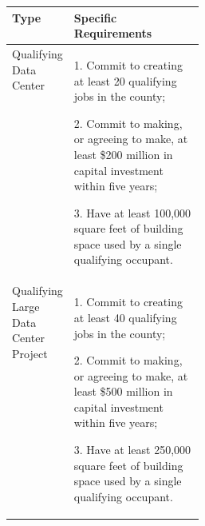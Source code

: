 \begin{longtable}{|L{0.28\linewidth}|L{\arrayrulewidth\relax}|}
\textbf{Type} & \textbf{Specific Requirements} \\ \hline
Qualifying Data Center &
1. Commit to creating at least 20 qualifying jobs in the county;\par
2. Commit to making, or agreeing to make, at least \$200 million in capital investment within five years;\par
3. Have at least 100,000 square feet of building space used by a single qualifying occupant.
\\ \hline
Qualifying Large Data Center Project &
1. Commit to creating at least 40 qualifying jobs in the county;\par
2. Commit to making, or agreeing to make, at least \$500 million in capital investment within five years;\par
3. Have at least 250,000 square feet of building space used by a single qualifying occupant.
\\ \hline
\end{longtable}
\endgroup
